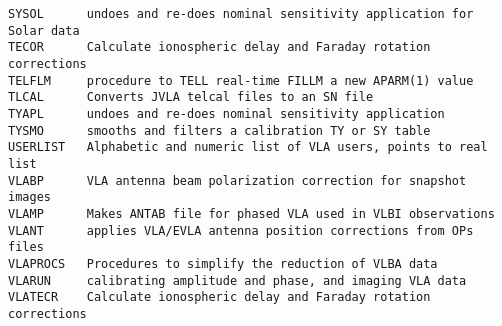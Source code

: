 \begin{verbatim}
SYSOL      undoes and re-does nominal sensitivity application for Solar data
TECOR      Calculate ionospheric delay and Faraday rotation corrections
TELFLM     procedure to TELL real-time FILLM a new APARM(1) value
TLCAL      Converts JVLA telcal files to an SN file
TYAPL      undoes and re-does nominal sensitivity application
TYSMO      smooths and filters a calibration TY or SY table
USERLIST   Alphabetic and numeric list of VLA users, points to real list
VLABP      VLA antenna beam polarization correction for snapshot images
VLAMP      Makes ANTAB file for phased VLA used in VLBI observations
VLANT      applies VLA/EVLA antenna position corrections from OPs files
VLAPROCS   Procedures to simplify the reduction of VLBA data
VLARUN     calibrating amplitude and phase, and imaging VLA data
VLATECR    Calculate ionospheric delay and Faraday rotation corrections
\end{verbatim}\eve


